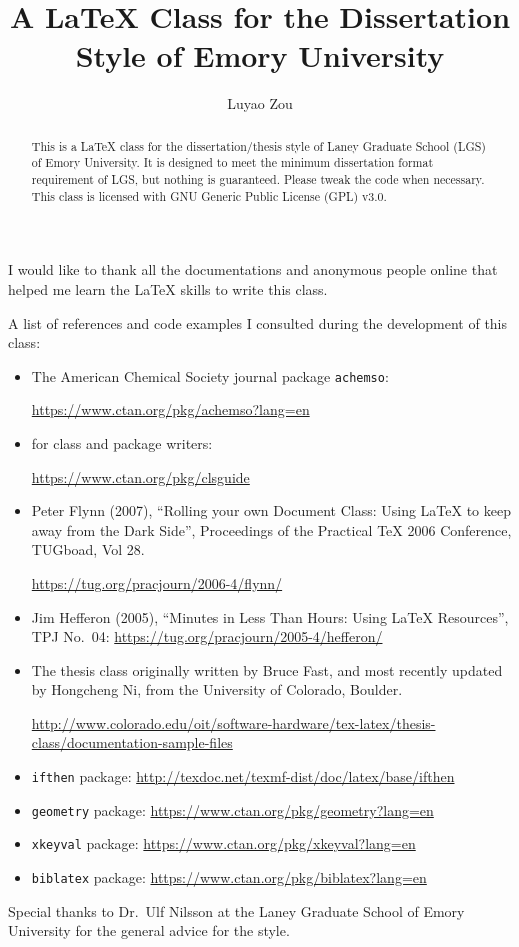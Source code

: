 \documentclass[final]{emory}
\title{A \LaTeX{} Class for the Dissertation Style of Emory University}
\author{Luyao Zou}                      %
\begin{document}
\begin{abstract}

This is a \LaTeX{} class for the dissertation/thesis style of Laney Graduate School (LGS) of Emory University.
It is designed to meet the minimum dissertation format
requirement of LGS, but nothing is guaranteed. Please tweak the
code when necessary. This class is licensed with GNU Generic Public License (GPL) v3.0.

\end{abstract}

\begin{acknowledgement}%

I would like to thank all the documentations and anonymous people online that
helped me learn the \LaTeX{} skills to write this class. 

A list of references and code examples I consulted during the development
of this class:
\begin{itemize}
  \item The American Chemical Society journal package \Verb|achemso|:
  
        \url{https://www.ctan.org/pkg/achemso?lang=en}
  \item \LaTeXe{} for class and package writers:
        
        \url{https://www.ctan.org/pkg/clsguide}
  \item Peter Flynn (2007), ``Rolling your own Document Class: Using \LaTeX{} to keep away from the Dark Side'', Proceedings of the Practical \TeX{} 2006 Conference, TUGboad, Vol 28.
        
        \url{https://tug.org/pracjourn/2006-4/flynn/}
  \item Jim Hefferon (2005), ``Minutes in Less Than Hours: Using \LaTeX{} Resources'', TPJ No.~04: 
        \url{https://tug.org/pracjourn/2005-4/hefferon/} 
  \item The thesis class originally written by Bruce Fast, and most recently updated by Hongcheng Ni, from the University of Colorado, Boulder. 
        
        \url{http://www.colorado.edu/oit/software-hardware/tex-latex/thesis-class/documentation-sample-files}
  \item \Verb|ifthen| package: \url{http://texdoc.net/texmf-dist/doc/latex/base/ifthen}
  \item \Verb|geometry| package: \url{https://www.ctan.org/pkg/geometry?lang=en}
  \item \Verb|xkeyval| package: \url{https://www.ctan.org/pkg/xkeyval?lang=en}
  \item \Verb|biblatex| package: \url{https://www.ctan.org/pkg/biblatex?lang=en}
\end{itemize}

Special thanks to Dr.~Ulf Nilsson at the Laney Graduate School of Emory University
for the general advice for the style.

\end{acknowledgement}
\end{document}
